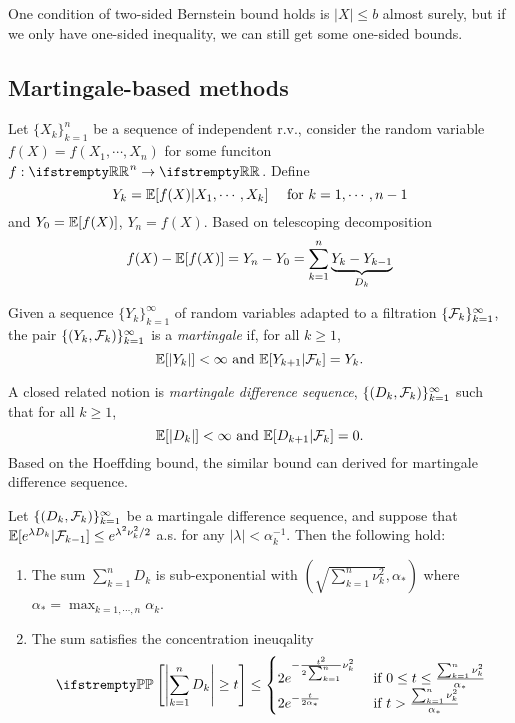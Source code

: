 \documentclass{paper}
\begin{document}
One condition of two-sided Bernstein bound holds is $\vert X\vert \leq b$ almost surely, but if we only have one-sided inequality, we can still get some one-sided bounds.

\subsection{Martingale-based methods}
Let $\{X_k\}_{k=1}^n$ be a sequence of independent r.v., consider the random variable $f(X)=f(X_1, \cdots , X_n)$ for some funciton $f:\RR^n\to \RR$.
Define
\[
	Y_k = \mathbb{E}[f(X)\vert X_1, \cdots, X_k]\quad \text{ for } k=1,\cdots, n-1
\]
and $Y_0 = \mathbb{E}[f(X)]$, $Y_n=f(X)$. Based on telescoping decomposition
\[
	f(X)-\mathbb{E}[f(X)] = Y_n-Y_0 =\sum_{k=1}^n\underbrace{Y_k-Y_{k-1}}_{D_k}
\]
\begin{defn}
	Given a sequence $\{Y_k\}_{k=1}^\infty$ of random variables adapted to a filtration $\{\mathcal{F}_k\}_{k=1}^\infty$, the pair $\{(Y_k, \mathcal{F}_k)\}_{k=1}^\infty$ is a \textit{martingale} if, for all $k\geq 1$,
	\[
		\mathbb{E}[\vert Y_k\vert]< \infty \text{ and } \mathbb{E}[Y_{k+1}\vert \mathcal{F}_k] = Y_k.
	\]
\end{defn}
A closed related notion is \textit{martingale difference sequence}, $\{(D_k, \mathcal{F}_k)\}_{k=1}^\infty$ such that for all $k\geq 1$,
\[
	\mathbb{E}[\vert D_k\vert]< \infty \text{ and } \mathbb{E}[D_{k+1}\vert \mathcal{F}_k] = 0.
\]
Based on the Hoeffding bound, the similar bound can derived for martingale difference sequence.
\begin{thm}
	Let $\{(D_k, \mathcal{F}_k)\}_{k=1}^\infty$ be a martingale difference sequence, and suppose that $\mathbb{E}[e^{\lambda D_k}\vert\mathcal{F}_{k-1}]\leq e^{\lambda^2\nu_k^2/2}$ a.s. for any $\vert \lambda \vert < \alpha_k^{-1}$. Then the following hold:
	\begin{enumerate}
		\item	The sum $\sum_{k=1}^n D_k$ is sub-exponential with $(\sqrt{\sum_{k=1}^n\nu_k^2}, \alpha_*)$ where $\alpha_*=\max_{k=1, \cdots, n}\alpha_k$.
		\item The sum satisfies the concentration ineuqality
		      \[
			      \PP\left[\left\vert \sum_{k=1}^nD_k\right\vert\geq t\right] \leq \begin{cases}
				      2e^{-\frac{t^2}{2\sum_{k=1}^n}\nu_k^2} & \text{ if } 0\leq t \leq \frac{\sum_{k=1}^n\nu_k^2}{\alpha_*} \\
				      2e^{-\frac{t}{2\alpha_*}}              & \text{ if } t > \frac{\sum_{k=1}^n\nu_k^2}{\alpha_*}
			      \end{cases}
		      \]
	\end{enumerate}
\end{thm}
\printbibliography
\end{document}
